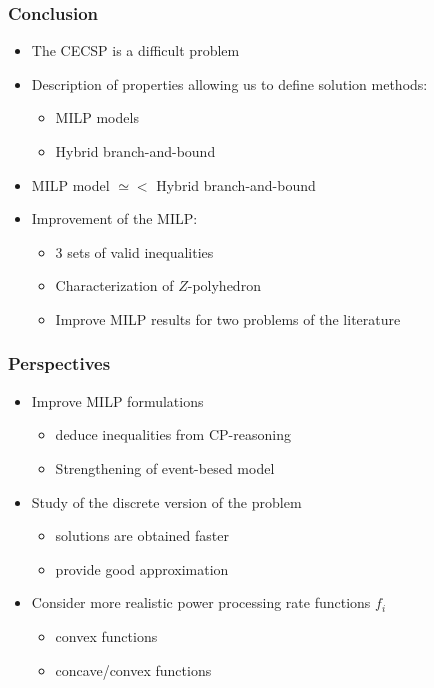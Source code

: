 \documentclass{beamer}
\begin{document}
\begin{frame}
  \frametitle{Conclusion}
  \vfill
  \begin{itemize}
  \item The CECSP is a difficult problem
    \vfill
\pause
  \item Description of properties allowing us to define solution
    methods:
    \begin{itemize}
    \item MILP models
    \item  Hybrid branch-and-bound 
    \end{itemize}
\pause
    \vfill 
  \item MILP model $\simeq<$ Hybrid branch-and-bound
    \vfill 
\pause
  \item Improvement of the MILP:
    \begin{itemize}
    \item 3 sets of valid inequalities
    \item Characterization of $Z$-polyhedron
    \item Improve MILP results for two problems of the literature 
    \end{itemize}
  \end{itemize}
\vfill
\pause
\end{frame}

\begin{frame}
  \frametitle{Perspectives}
  \vfill
    \begin{itemize}
    \item Improve MILP formulations
\pause
      \begin{itemize}
      \item deduce inequalities from CP-reasoning
      \item Strengthening of event-besed model
      \end{itemize}
      \vfill
\pause
    \item Study of the discrete version of the problem
      \begin{itemize}
\pause
      \item solutions are obtained faster  
      \item provide good approximation
      \end{itemize}
      \vfill
\pause
    \item Consider more realistic power processing rate functions
      $f_i$
      \begin{itemize}
\pause
      \item convex functions
      \item concave/convex functions
      \end{itemize}
\pause
    \end{itemize}
  \vfill
\end{frame}
\end{document}
